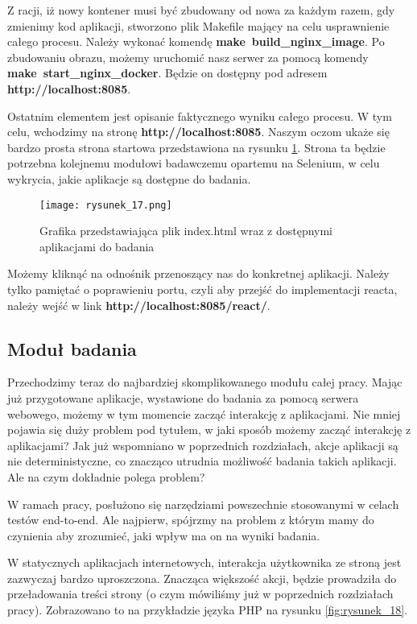 Z racji, iż nowy kontener musi być zbudowany od nowa za każdym razem, gdy zmienimy kod aplikacji, stworzono plik Makefile mający na celu usprawnienie całego procesu.
Należy wykonać komendę \textbf{make\ build\_nginx\_image}.
Po zbudowaniu obrazu, możemy uruchomić nasz serwer za pomocą komendy \textbf{make\ start\_nginx\_docker}. Będzie on dostępny pod adresem \textbf{http://localhost:8085}.

Ostatnim elementem jest opisanie faktycznego wyniku całego procesu. W tym celu, wchodzimy na stronę \textbf{http://localhost:8085}. Naszym oczom ukaże się bardzo prosta strona startowa przedstawiona na rysunku \ref{fig:rysunek_17}.
Strona ta będzie potrzebna kolejnemu modułowi badawczemu opartemu na Selenium, w celu wykrycia, jakie aplikacje są dostępne do badania.

\begin{figure}[htbp]
    \centering
    \texttt{[image: rysunek\_17.png]}
    \caption{Grafika przedstawiająca plik index.html wraz z dostępnymi aplikacjami do badania}
    \label{fig:rysunek_17}
\end{figure}

Możemy kliknąć na odnośnik przenoszący nas do konkretnej aplikacji.
Należy tylko pamiętać o poprawieniu portu, czyli aby przejść do implementacji reacta, należy wejść w link \linebreak \textbf{http://localhost:8085/react/}.


\subsection{Moduł badania}

Przechodzimy teraz do najbardziej skomplikowanego modułu całej pracy.
Mając już przygotowane aplikacje, wystawione do badania za pomocą serwera webowego, możemy w tym momencie zacząć interakcję z aplikacjami.
Nie mniej pojawia się duży problem pod tytułem, w jaki sposób możemy zacząć interakcję z aplikacjami?
Jak już wspomniano w poprzednich rozdziałach, akcje aplikacji są nie deterministyczne, co znacząco utrudnia możliwość badania takich aplikacji.
Ale na czym dokładnie polega problem?

W ramach pracy, posłużono się narzędziami powszechnie stosowanymi w celach testów end-to-end.
Ale najpierw, spójrzmy na problem z którym mamy do czynienia aby zrozumieć, jaki wpływ ma on na wyniki badania.

W statycznych aplikacjach internetowych, interakcja użytkownika ze stroną jest zazwyczaj bardzo uproszczona.
Znacząca większość akcji, będzie prowadziła do przeładowania treści strony (o czym mówiliśmy już w poprzednich rozdziałach pracy).
Zobrazowano to na przykładzie języka PHP na rysunku \ref{fig:rysunek_18}.

